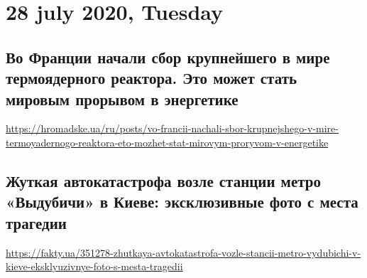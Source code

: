  

\section{28 july 2020, Tuesday}
\subsection{Во Франции начали сбор крупнейшего в мире термоядерного реактора. Это может стать мировым прорывом в энергетике}

\url{https://hromadske.ua/ru/posts/vo-francii-nachali-sbor-krupnejshego-v-mire-termoyadernogo-reaktora-eto-mozhet-stat-mirovym-proryvom-v-energetike}

\subsection{Жуткая автокатастрофа возле станции метро «Выдубичи» в Киеве: эксклюзивные фото с места трагедии}
 
\url{https://fakty.ua/351278-zhutkaya-avtokatastrofa-vozle-stancii-metro-vydubichi-v-kieve-eksklyuzivnye-foto-s-mesta-tragedii}

